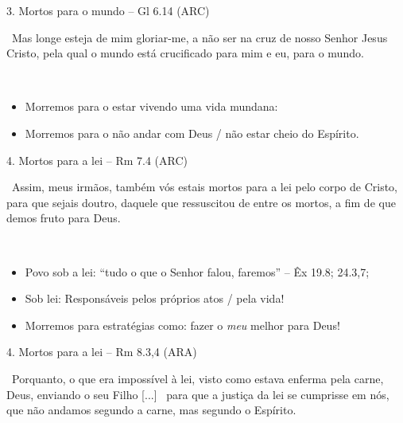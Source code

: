 \documentclass[12pt,aspectratio=169]{beamer}
\newcommand{\ver}[1]{%
    \raisebox{0.50ex}{%
        \scalebox{1.1}{%
            \pmb{\textbf{\textcolor{BSpbg}{#1}}}%
        }%
    }%
}
\newcommand{\QUOTE}[1]{%
    \par\noindent\hspace*{0.05\linewidth}%
    \begin{minipage}{0.9\linewidth}%
        \linespread{1.35}\large{#1}%
    \end{minipage}%
}
\newcommand{\RED}[1]{{\textcolor{TXred}{#1}}}
\newcommand{\YEL}[1]{{\textcolor{TXyel}{#1}}}
\newcommand{\GRE}[1]{{\textcolor{TXgre}{#1}}}
\newcommand{\MAG}[1]{{\textcolor{TXmag}{#1}}}
\newcommand{\BRI}[1]{{\textcolor{BSpbg}{#1}}}   %
\begin{document}
    \begin{frame}{3. \YEL{Mortos para o mundo} -- Gl 6.14 (ARC)}
        \QUOTE{%
            \ver{14}~Mas longe esteja de mim gloriar-me, a não ser na cruz de nosso Senhor Jesus
            Cristo, pela qual \YEL{o mundo está crucificado para mim e eu, para o mundo}.
        }
        \\[1.5\bigskipamount]
        \begin{itemize}
            \item<2-> Morremos para o estar vivendo uma vida \BRI{mundana}:
            \item<3-> Morremos para o não \BRI{andar com Deus} / não estar \BRI{cheio do Espírito}.
        \end{itemize}
    \end{frame}

    \begin{frame}{4. \YEL{Mortos para a lei} -- Rm 7.4 (ARC)}
        \QUOTE{%
            \ver{4}~Assim, meus irmãos, também vós \YEL{estais mortos para a lei} pelo
            \MAG{corpo de Cristo}, para que sejais doutro, daquele que ressuscitou de entre os
            mortos, a fim de que \GRE{demos fruto para Deus}.
        }
        \\[1.5\bigskipamount]
        \begin{itemize}
            \item<2-> Povo sob a lei: ``\BRI{tudo o que o Senhor falou, faremos}'' -- Êx 19.8; 24.3,7;
            \item<3-> Sob lei: Responsáveis pelos \BRI{próprios atos} / pela \BRI{vida!}
            \item<4-> Morremos para estratégias como: \BRI{fazer o \emph{meu} melhor para Deus!}
        \end{itemize}
    \end{frame}

    \begin{frame}{4. \YEL{Mortos para a lei} -- Rm 8.3,4 (ARA)}
        \QUOTE{%
            \ver{3}~Porquanto, o que era \YEL{impossível} à lei, visto como estava \RED{enferma
            pela carne}, Deus, enviando o seu Filho [...]
            \ver{4}~para que a justiça da lei se cumprisse em nós, que não andamos segundo a
            \RED{carne}, mas segundo o \GRE{Espírito}.
        }
    \end{frame}
\end{document}
